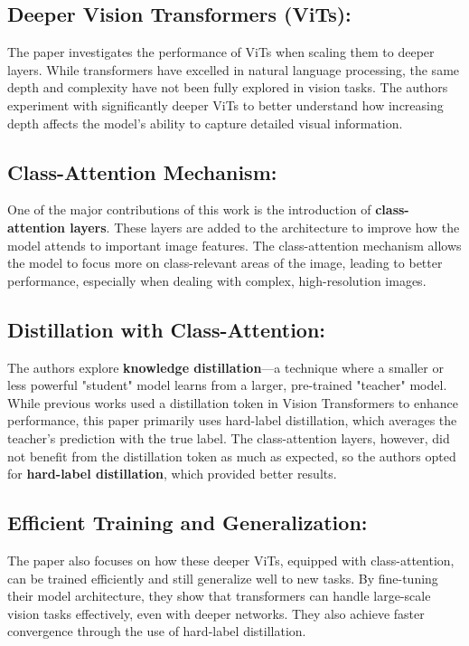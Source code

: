 \documentclass{report}
\begin{document}
	\subsection{Deeper Vision Transformers (ViTs):}
	The paper investigates the performance of ViTs when scaling them to deeper layers. While transformers have excelled in natural language processing, the same depth and complexity have not been fully explored in vision tasks. The authors experiment with significantly deeper ViTs to better understand how increasing depth affects the model’s ability to capture detailed visual information.
	
	\subsection{Class-Attention Mechanism:}
	One of the major contributions of this work is the introduction of \textbf{class-attention layers}. These layers are added to the architecture to improve how the model attends to important image features. The class-attention mechanism allows the model to focus more on class-relevant areas of the image, leading to better performance, especially when dealing with complex, high-resolution images.
	
	\subsection{Distillation with Class-Attention:}
	The authors explore \textbf{knowledge distillation}—a technique where a smaller or less powerful "student" model learns from a larger, pre-trained "teacher" model. While previous works used a distillation token in Vision Transformers to enhance performance, this paper primarily uses hard-label distillation, which averages the teacher’s prediction with the true label. The class-attention layers, however, did not benefit from the distillation token as much as expected, so the authors opted for \textbf{hard-label distillation}, which provided better results.
	
	
	
	\subsection{Efficient Training and Generalization:}
	The paper also focuses on how these deeper ViTs, equipped with class-attention, can be trained efficiently and still generalize well to new tasks. By fine-tuning their model architecture, they show that transformers can handle large-scale vision tasks effectively, even with deeper networks. They also achieve faster convergence through the use of hard-label distillation.
	
\end{document}
